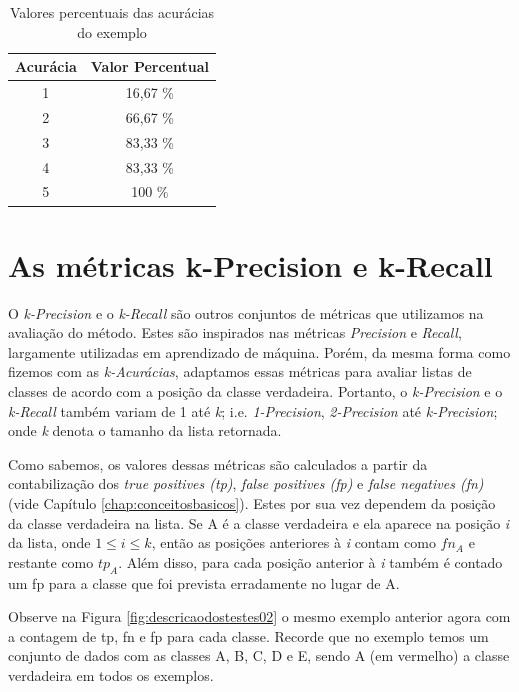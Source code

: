 \begin{table}[h!]
  \begin{center}
    \begin{tabular}{cc}
      \hline
      \textbf{Acurácia} & \textbf{Valor Percentual} \\
      \hline

      1 & 16,67 \% \\
      2 & 66,67 \% \\
      3 & 83,33 \% \\
      4 & 83,33 \% \\
      5 & 100 \% \\

      \hline
    \end{tabular}
    \caption{Valores percentuais das acurácias do exemplo}
    \label{tab:valoresacuraciasexemplo}
  \end{center}
\end{table}

\section{As métricas k-Precision e k-Recall}

O \textit{k-Precision} e o \textit{k-Recall} são outros conjuntos de métricas que utilizamos na avaliação do método.
Estes são inspirados nas métricas \textit{Precision} e \textit{Recall}, largamente utilizadas em aprendizado de máquina.
Porém, da mesma forma como fizemos com as \textit{k-Acurácias}, adaptamos essas métricas para avaliar listas de classes de acordo com a posição da classe verdadeira.
Portanto, o \textit{k-Precision} e o \textit{k-Recall} também variam de 1 até \textit{k}; i.e. \textit{1-Precision}, \textit{2-Precision} até \textit{k-Precision}; onde \textit{k} denota o tamanho da lista retornada.

Como sabemos, os valores dessas métricas são calculados a partir da contabilização dos \textit{true positives (tp)}, \textit{false positives (fp)} e \textit{false negatives (fn)} (vide Capítulo \ref{chap:conceitosbasicos}).
Estes por sua vez dependem da posição da classe verdadeira na lista.
Se A é a classe verdadeira e ela aparece na posição \textit{i} da lista, onde $1 \leq \textit{i} \leq \textit{k}$, então as posições anteriores à \textit{i} contam como $fn_A$ e restante como $tp_A$.
Além disso, para cada posição anterior à \textit{i} também é contado um fp para a classe que foi prevista erradamente no lugar de A.

Observe na Figura \ref{fig:descricaodostestes02} o mesmo exemplo anterior agora com a contagem de tp, fn e fp para cada classe.
Recorde que no exemplo temos um conjunto de dados com as classes A, B, C, D e E, sendo A (em vermelho) a classe verdadeira em todos os exemplos.

